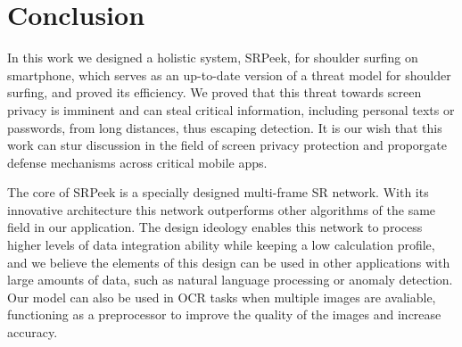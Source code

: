 \section{Conclusion}
\label{sec-conclusion}
In this work we designed a holistic system, SRPeek, for shoulder surfing on smartphone, which serves as an up-to-date version of a threat model for shoulder surfing, and proved its efficiency. We proved that this threat towards screen privacy is imminent and can steal critical information, including personal texts or passwords, from long distances, thus escaping detection. It is our wish that this work can stur discussion in the field of screen privacy protection and proporgate defense mechanisms across critical mobile apps.

The core of SRPeek is a specially designed multi-frame SR network. With its innovative architecture this network outperforms other algorithms of the same field in our application. The design ideology enables this network to process higher levels of data integration ability while keeping a low calculation profile, and we believe the elements of this design can be used in other applications with large amounts of data, such as natural language processing or anomaly detection. Our model can also be used in OCR tasks when multiple images are avaliable, functioning as a preprocessor to improve the quality of the images and increase accuracy.